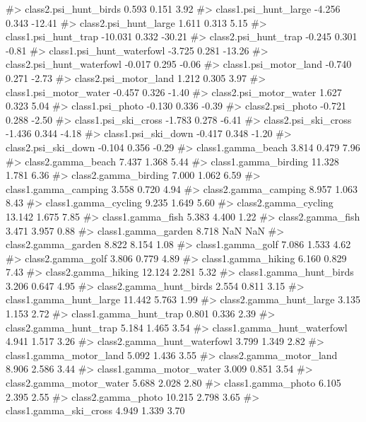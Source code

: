 \begin{Schunk}
\begin{Soutput}
#> class2.psi_hunt_birds          0.593   0.151   3.92
#> class1.psi_hunt_large         -4.256   0.343 -12.41
#> class2.psi_hunt_large          1.611   0.313   5.15
#> class1.psi_hunt_trap         -10.031   0.332 -30.21
#> class2.psi_hunt_trap          -0.245   0.301  -0.81
#> class1.psi_hunt_waterfowl     -3.725   0.281 -13.26
#> class2.psi_hunt_waterfowl     -0.017   0.295  -0.06
#> class1.psi_motor_land         -0.740   0.271  -2.73
#> class2.psi_motor_land          1.212   0.305   3.97
#> class1.psi_motor_water        -0.457   0.326  -1.40
#> class2.psi_motor_water         1.627   0.323   5.04
#> class1.psi_photo              -0.130   0.336  -0.39
#> class2.psi_photo              -0.721   0.288  -2.50
#> class1.psi_ski_cross          -1.783   0.278  -6.41
#> class2.psi_ski_cross          -1.436   0.344  -4.18
#> class1.psi_ski_down           -0.417   0.348  -1.20
#> class2.psi_ski_down           -0.104   0.356  -0.29
#> class1.gamma_beach             3.814   0.479   7.96
#> class2.gamma_beach             7.437   1.368   5.44
#> class1.gamma_birding          11.328   1.781   6.36
#> class2.gamma_birding           7.000   1.062   6.59
#> class1.gamma_camping           3.558   0.720   4.94
#> class2.gamma_camping           8.957   1.063   8.43
#> class1.gamma_cycling           9.235   1.649   5.60
#> class2.gamma_cycling          13.142   1.675   7.85
#> class1.gamma_fish              5.383   4.400   1.22
#> class2.gamma_fish              3.471   3.957   0.88
#> class1.gamma_garden            8.718     NaN    NaN
#> class2.gamma_garden            8.822   8.154   1.08
#> class1.gamma_golf              7.086   1.533   4.62
#> class2.gamma_golf              3.806   0.779   4.89
#> class1.gamma_hiking            6.160   0.829   7.43
#> class2.gamma_hiking           12.124   2.281   5.32
#> class1.gamma_hunt_birds        3.206   0.647   4.95
#> class2.gamma_hunt_birds        2.554   0.811   3.15
#> class1.gamma_hunt_large       11.442   5.763   1.99
#> class2.gamma_hunt_large        3.135   1.153   2.72
#> class1.gamma_hunt_trap         0.801   0.336   2.39
#> class2.gamma_hunt_trap         5.184   1.465   3.54
#> class1.gamma_hunt_waterfowl    4.941   1.517   3.26
#> class2.gamma_hunt_waterfowl    3.799   1.349   2.82
#> class1.gamma_motor_land        5.092   1.436   3.55
#> class2.gamma_motor_land        8.906   2.586   3.44
#> class1.gamma_motor_water       3.009   0.851   3.54
#> class2.gamma_motor_water       5.688   2.028   2.80
#> class1.gamma_photo             6.105   2.395   2.55
#> class2.gamma_photo            10.215   2.798   3.65
#> class1.gamma_ski_cross         4.949   1.339   3.70

\end{Soutput}
\end{Schunk}
